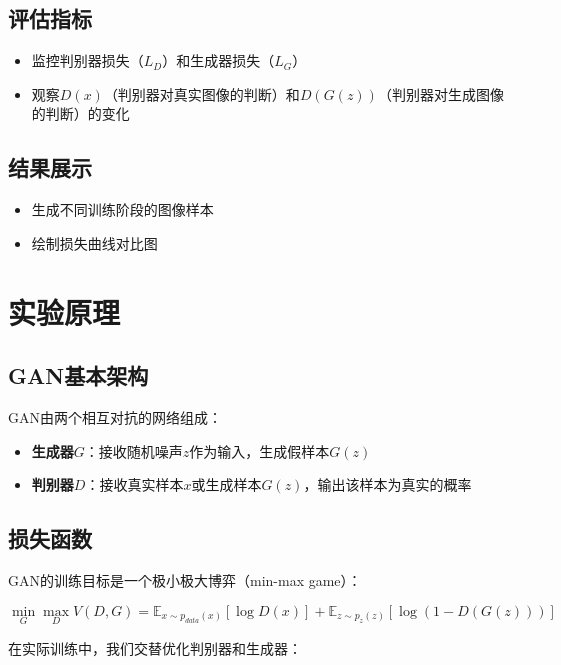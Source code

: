\documentclass[a4paper]{article}
\begin{document}
\subsection{评估指标}
\begin{itemize}
    \item 监控判别器损失（$L_D$）和生成器损失（$L_G$）
    \item 观察$D(x)$（判别器对真实图像的判断）和$D(G(z))$（判别器对生成图像的判断）的变化
\end{itemize}

\subsection{结果展示}
\begin{itemize}
    \item 生成不同训练阶段的图像样本
    \item 绘制损失曲线对比图
\end{itemize}

\section{实验原理}

\subsection{GAN基本架构}

GAN由两个相互对抗的网络组成：

\begin{itemize}
    \item \textbf{生成器$G$}：接收随机噪声$z$作为输入，生成假样本$G(z)$
    \item \textbf{判别器$D$}：接收真实样本$x$或生成样本$G(z)$，输出该样本为真实的概率
\end{itemize}

\subsection{损失函数}

GAN的训练目标是一个极小极大博弈（min-max game）：

\begin{equation}
    \min_G \max_D V(D, G) = \mathbb{E}_{x \sim p_{data}(x)}[\log D(x)] + \mathbb{E}_{z \sim p_z(z)}[\log(1 - D(G(z)))]
\end{equation}

在实际训练中，我们交替优化判别器和生成器：
\end{document}
